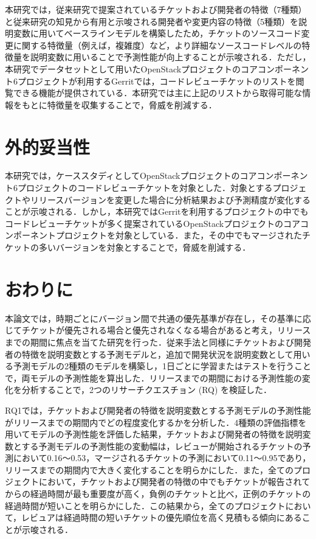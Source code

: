 \documentclass[submit]{ipsj}
\begin{document}
本研究では，従来研究\cite{prioritizer}で提案されているチケットおよび開発者の特徴（7種類）と従来研究\cite{release_merge}\cite{review1}の知見から有用と示唆される開発者や変更内容の特徴（5種類）を説明変数に用いてベースラインモデルを構築したため，チケットのソースコード変更に関する特徴量（例えば，複雑度）など，より詳細なソースコードレベルの特徴量を説明変数に用いることで予測性能が向上することが示唆される．ただし，本研究でデータセットとして用いたOpenStackプロジェクトのコアコンポーネント6プロジェクトが利用するGerritでは，コードレビューチケットのリストを閲覧できる機能が提供されている．本研究では主に上記のリストから取得可能な情報をもとに特徴量を収集することで，脅威を削減する．

\section{外的妥当性}
本研究では，ケーススタディとしてOpenStackプロジェクトのコアコンポーネント6プロジェクトのコードレビューチケットを対象とした．対象とするプロジェクトやリリースバージョンを変更した場合に分析結果および予測精度が変化することが示唆される．しかし，本研究ではGerritを利用するプロジェクトの中でもコードレビューチケットが多く提案されているOpenStackプロジェクトのコアコンポーネントプロジェクトを対象としている．また，その中でもマージされたチケットの多いバージョンを対象とすることで，脅威を削減する．


\section{おわりに}\label{sec:fig-tab-exp}
本論文では，時期ごとにバージョン間で共通の優先基準が存在し，その基準に応じてチケットが優先される場合と優先されなくなる場合があると考え，リリースまでの期間に焦点を当てた研究を行った．従来手法と同様にチケットおよび開発者の特徴を説明変数とする予測モデルと，追加で開発状況を説明変数として用いる予測モデルの2種類のモデルを構築し，1日ごとに学習またはテストを行うことで，両モデルの予測性能を算出した．リリースまでの期間における予測性能の変化を分析することで，2つのリサーチクエスチョン (RQ) を検証した．

RQ1では，チケットおよび開発者の特徴を説明変数とする予測モデルの予測性能がリリースまでの期間内でどの程度変化するかを分析した．4種類の評価指標を用いてモデルの予測性能を評価した結果，チケットおよび開発者の特徴を説明変数とする予測モデルの予測性能の変動幅は，レビューが開始されるチケットの予測において0.16〜0.53，マージされるチケットの予測において0.11〜0.95であり，リリースまでの期間内で大きく変化することを明らかにした．また，全てのプロジェクトにおいて，チケットおよび開発者の特徴の中でもチケットが報告されてからの経過時間が最も重要度が高く，負例のチケットと比べ，正例のチケットの経過時間が短いことを明らかにした．この結果から，全てのプロジェクトにおいて，レビュアは経過時間の短いチケットの優先順位を高く見積もる傾向にあることが示唆される．
\end{document}
